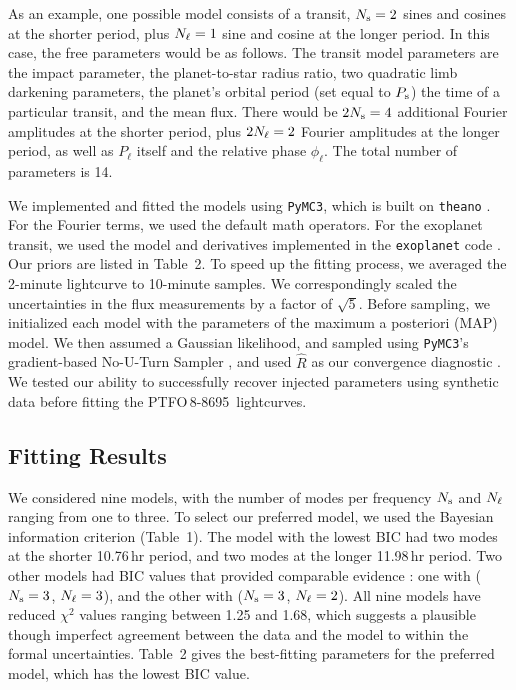 \documentclass[12pt,twocolumn,tighten]{aastex62}
\newcommand{\ptfo}{PTFO$\,$8-8695}
\begin{document}
As an example, one possible model consists of a transit, $N_{\rm s}=2$
sines and cosines at the shorter period, plus $N_{\rm \ell}=1$ sine
and cosine at the longer period.  In this case, the free parameters
would be as follows.  The transit model parameters are the impact
parameter, the planet-to-star radius ratio, two quadratic limb
darkening parameters, the planet's orbital period (set equal to
$P_{\rm s}$) the time of a particular transit, and the mean flux.
There would be $2N_{\rm s}=4$ additional Fourier amplitudes at the
shorter period, plus $2N_{\rm \ell}=2$ Fourier amplitudes at the
longer period, as well as $P_\ell$ itself and the relative phase
$\phi_\ell$.  The total number of parameters is 14.

We implemented and fitted the models using \texttt{PyMC3}, which is
built on \texttt{theano}
\citep{salvatier_2016_PyMC3,exoplanet:theano}.  For the Fourier terms,
we used the default math operators.  For the exoplanet transit, we
used the model and derivatives implemented in the \texttt{exoplanet}
code \citep{exoplanet:exoplanet}.  Our priors are listed in Table~2.
To speed up the fitting process, we averaged the 2-minute lightcurve
to 10-minute samples.  We correspondingly scaled the uncertainties in
the flux measurements by a factor of $\sqrt{5}$.  Before sampling, we
initialized each model with the parameters of the maximum a posteriori
(MAP) model.  We then assumed a Gaussian likelihood, and sampled using
\texttt{PyMC3}'s gradient-based No-U-Turn Sampler
\citep{hoffman_no-u-turn_2014}, and used $\hat{R}$ as our convergence
diagnostic \citep{gelman_inference_1992}.  We tested our ability to
successfully recover injected parameters using synthetic data before
fitting the \ptfo\ lightcurves.


\subsection{Fitting Results}

We considered nine models, with the number of modes per frequency
$N_{\rm s}$ and $N_{\rm \ell}$ ranging from one to three.  To select
our preferred model, we used the Bayesian information criterion
(Table~1).  The model with the lowest BIC had two modes at the shorter
10.76$\,$hr period, and two modes at the longer 11.98$\,$hr period.
Two other models had BIC values that provided comparable evidence
\citep{burnham_multimodel_2016}: one with ($N_{\rm s}=3$, $N_{\rm
\ell}=3$), and the other with ($N_{\rm s}=3$, $N_{\rm \ell}=2$).
All nine models have
reduced $\chi^2$ values ranging between 1.25 and 1.68, which suggests
a plausible though imperfect agreement between the data and the model
to within the formal uncertainties.  Table~2 gives the best-fitting
parameters for the preferred model, which has the lowest BIC value.
\end{document}
